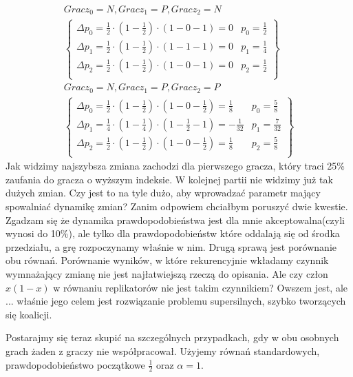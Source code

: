\begin{align*}
Gracz_0 = N, Gracz_1 = P, Gracz_2 = N \\
\left\{
\begin{array}{ll}
\Delta p_0 = \frac{1}{2} \cdot (1 - \frac{1}{2}) \cdot (1 - 0 - 1) =  0 & p_0=\frac{1}{2}\\
\Delta p_1 = \frac{1}{2} \cdot (1 - \frac{1}{2}) \cdot (1 - 1 - 1) =  0 & p_1= \frac{1}{4}\\
\Delta p_2 = \frac{1}{2} \cdot (1 - \frac{1}{2}) \cdot (1 - 0 - 1) =  0 & p_2=\frac{1}{2}\\
\end{array} 
\right\}
\\
Gracz_0 = N, Gracz_1 = P, Gracz_2 = P \\
\left\{
\begin{array}{ll}
\Delta p_0 = \frac{1}{2} \cdot (1 - \frac{1}{2}) \cdot (1 - 0 - \frac{1}{2}) = \frac{1}{8} & p_0=\frac{5}{8}\\
\Delta p_1 = \frac{1}{4} \cdot (1 - \frac{1}{4}) \cdot (1 - \frac{1}{2} - 1) = -\frac{1}{32} & p_1= \frac{7}{32}\\
\Delta p_2 = \frac{1}{2} \cdot (1 - \frac{1}{2}) \cdot (1 - 0 - \frac{1}{2}) = \frac{1}{8}  & p_2=\frac{5}{8}\\
\end{array}
\right\}
\end{align*}
Jak widzimy najszybsza zmiana zachodzi dla pierwszego gracza, który traci 25\% zaufania do gracza o wyższym indeksie. W kolejnej partii nie widzimy już tak dużych zmian. Czy jest to na tyle dużo, aby wprowadzać parametr mający spowalniać dynamikę zmian? Zanim odpowiem chciałbym poruszyć dwie kwestie. Zgadzam się że dynamika prawdopodobieństwa jest dla mnie akceptowalna(czyli wynosi do 10\%), ale tylko dla prawdopodobieństw które oddalają się od środka przedziału, a grę rozpoczynamy właśnie w nim. Drugą sprawą jest porównanie obu równań. Porównanie wyników, w które rekurencyjnie wkładamy czynnik wymnażający zmianę nie jest najłatwiejszą rzeczą do opisania. Ale czy człon $x(1-x)$ w równaniu replikatorów nie jest takim czynnikiem? Owszem jest, ale ... właśnie jego celem jest rozwiązanie problemu supersilnych, szybko tworzących się koalicji.

Postarajmy się teraz skupić na szczególnych przypadkach, gdy w obu osobnych grach żaden z graczy nie współpracował. Użyjemy równań standardowych, prawdopodobieństwo początkowe $\frac{1}{2}$ oraz $\alpha = 1$.

